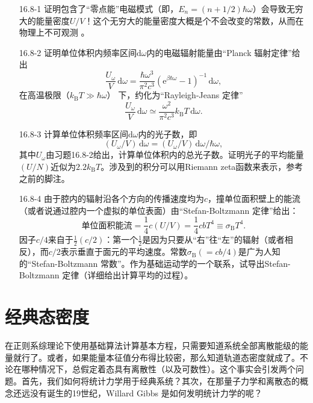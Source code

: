 \begin{itemize}
\item[16.8-1] 证明包含了``零点能''电磁模式（即，$E_n=(n+1/2)\hbar\omega$）会导致无穷大的能量密度$U/V$！这个无穷大的能量密度大概是个不会改变的常数，从而在物理上不可观测%
。
\item[16.8-2] 证明单位体积内频率区间$\mathrm d\omega$内的电磁辐射能量由``Planck 辐射定律''给出
\begin{equation*}
\frac{U_\omega}{V}\,\mathrm d\omega = \frac{\hbar\omega^3}{\pi^2c^3}(\mathrm e^{\beta\hbar\omega}-1)^{-1}\,\mathrm d\omega,
\end{equation*}
在高温极限（$k_\text{B}T\gg\hbar\omega$）%
%
下，约化为``Rayleigh-Jeans 定律''
\begin{equation*}
\frac{U_\omega}{V}\,\mathrm d\omega \simeq \frac{\omega^2}{\pi^2c^3}k_\text{B}T\,\mathrm d\omega.
\end{equation*}
\item[16.8-3] 计算单位体积频率区间$\mathrm d\omega$内的光子数，即
\begin{equation*}
(U_\omega/V)\,\mathrm d\omega = (U_\omega/V)\,\mathrm d\omega/\hbar\omega,
\end{equation*}
其中$U_\omega$由习题16.8-2给出，计算单位体积内的总光子数。证明光子的平均能量$(U/N)$近似为$2.2k_\text{B}T$。涉及到的积分可以用Riemann zeta函数来表示，参考之前的脚注。
\item[16.8-4] 由于腔内的辐射沿各个方向的传播速度均为$c$，撞单位面积壁上的能流（或者说通过腔内一个虚拟的单位表面）由``Stefan-Boltzmann 定律''给出：
\begin{equation}
\text{单位面积能流}=\frac{1}{4}c(U/V)=\frac{1}{4}cbT^4\equiv \sigma_\text{B}T^4.
\end{equation}
因子$c/4$来自于$\frac{1}{2}(c/2)$：第一个$\frac{1}{2}$是因为只要从``右''往``左''的辐射（或者相反），而$c/2$表示垂直于面元的平均速度。常数$\sigma_\text{B}(=cb/4)$是广为人知的``Stefan-Boltzmann 常数''。作为基础运动学的一个联系，试导出Stefan-Boltzmann 定律（详细给出计算平均的过程）。
\end{itemize}
\section{经典态密度}\label{sec16.9}
在正则系综理论下使用基础算法计算基本方程，只需要知道系统全部离散能级的能量就行了。或者，如果能量本征值分布得比较密，那么知道轨道态密度就成了。不论在哪种情况下，总假定着态具有离散性（以及可数性）。这个事实会引发两个问题。首先，我们如何将统计力学用于经典系统？其次，在那量子力学和离散态的概念还远没有诞生的19世纪，Willard Gibbs 是如何发明统计力学的呢？

